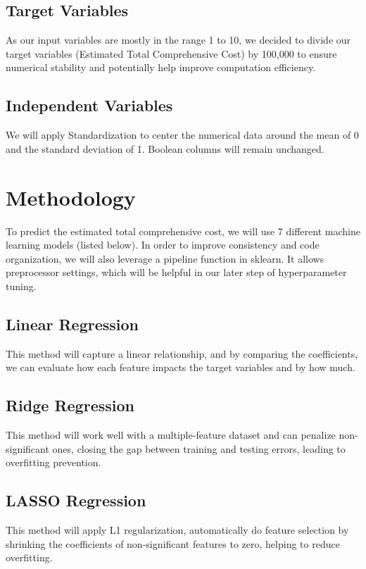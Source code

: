 \documentclass[conference]{IEEEtran}
\begin{document}
\subsection{Target Variables}
As our input variables are mostly in the range 1 to 10, we decided to divide our target variables (Estimated Total Comprehensive Cost) by 100,000 to ensure numerical stability and potentially help improve computation efficiency. 

\subsection{Independent Variables}
We will apply Standardization to center the numerical data around the mean of 0 and the standard deviation of 1. Boolean columns will remain unchanged. 

\section{Methodology}
To predict the estimated total comprehensive cost, we will use 7 different machine learning models (listed below). In order to improve consistency and code organization, we will also leverage a pipeline function in sklearn. It allows preprocessor settings, which will be helpful in our later step of hyperparameter tuning. 

\subsection{Linear Regression}
This method will capture a linear relationship, and by comparing the coefficients, we can evaluate how each feature impacts the target variables and by how much. 

\subsection{Ridge Regression}
This method will work well with a multiple-feature dataset and can penalize non-significant ones, closing the gap between training and testing errors, leading to overfitting prevention. 

\subsection{LASSO Regression}
This method will apply L1 regularization, automatically do feature selection by shrinking the coefficients of non-significant features to zero,  helping to reduce overfitting. 
\end{document}
